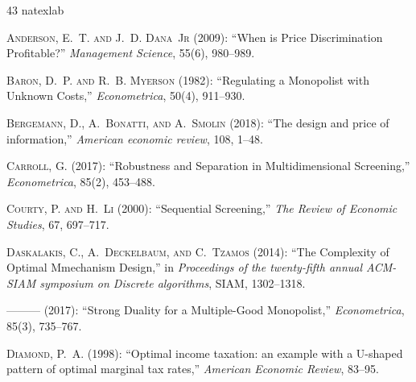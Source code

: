 \documentclass[12pt,letterpaper]{article}
\theoremstyle{plain}
\theoremstyle{definition}
\theoremstyle{remark}
\renewcommand{\1}{\mathds{1}}
\theoremstyle{definition}
\begin{document}
\begin{thebibliography}{43}
\newcommand{\enquote}[1]{``#1''}
\expandafter\ifx\csname natexlab\endcsname\relax\def\natexlab#1{#1}\fi

\textsc{Anderson, E.~T. and J.~D. Dana~Jr} (2009): \enquote{When is Price Discrimination Profitable?} \emph{Management Science}, 55(6), 980--989.

\textsc{Baron, D.~P. and R.~B. Myerson} (1982): \enquote{{Regulating a Monopolist with Unknown Costs},} \emph{Econometrica}, 50(4), 911--930.

\textsc{Bergemann, D., A.~Bonatti, and A.~Smolin} (2018): \enquote{The design and price of information,} \emph{American economic review}, 108, 1--48.

\textsc{Carroll, G.} (2017): \enquote{{Robustness and Separation in Multidimensional Screening},} \emph{Econometrica}, 85(2), 453--488.

\textsc{Courty, P. and H.~Li} (2000): \enquote{{Sequential Screening},} \emph{The Review of Economic Studies}, 67, 697--717.

\textsc{Daskalakis, C., A.~Deckelbaum, and C.~Tzamos} (2014): \enquote{The Complexity of Optimal Mmechanism Design,} in \emph{Proceedings of the twenty-fifth annual ACM-SIAM symposium on Discrete algorithms}, SIAM, 1302--1318.

---\hspace{-.1pt}---\hspace{-.1pt}--- (2017): \enquote{Strong Duality for a Multiple-Good Monopolist,} \emph{Econometrica}, 85(3), 735--767.

\textsc{Diamond, P.~A.} (1998): \enquote{Optimal income taxation: an example with a U-shaped pattern of optimal marginal tax rates,} \emph{American Economic Review}, 83--95.


\end{thebibliography}
\end{document}
